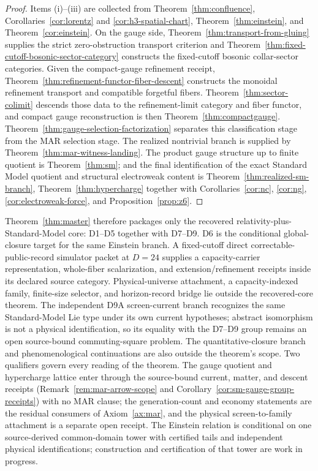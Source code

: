 \documentclass[11pt]{article}
\begin{document}
\begin{proof}
Items (i)--(iii) are collected from Theorem~\ref{thm:confluence}, Corollaries~\ref{cor:lorentz} and \ref{cor:h3-spatial-chart}, Theorem~\ref{thm:einstein}, and Theorem~\ref{cor:einstein}. On the gauge side, Theorem~\ref{thm:transport-from-gluing} supplies the strict zero-obstruction transport criterion and Theorem~\ref{thm:fixed-cutoff-bosonic-sector-category} constructs the fixed-cutoff bosonic collar-sector categories. Given the compact-gauge refinement receipt, Theorem~\ref{thm:refinement-functor-fiber-descent} constructs the monoidal refinement transport and compatible forgetful fibers. Theorem~\ref{thm:sector-colimit} descends those data to the refinement-limit category and fiber functor, and compact gauge reconstruction is then Theorem~\ref{thm:compactgauge}. Theorem~\ref{thm:gauge-selection-factorization} separates this classification stage from the MAR selection stage. The realized nontrivial branch is supplied by Theorem~\ref{thm:mar-witness-landing}. The product gauge structure up to finite quotient is Theorem~\ref{thm:sm}; and the final identification of the exact Standard Model quotient and structural electroweak content is Theorem~\ref{thm:realized-sm-branch}, Theorem~\ref{thm:hypercharge} together with Corollaries~\ref{cor:nc}, \ref{cor:ng}, \ref{cor:electroweak-force}, and Proposition~\ref{prop:z6}.
\end{proof}

Theorem~\ref{thm:master} therefore packages only the recovered relativity-plus-Standard-Model core: D1--D5 together with D7--D9. D6 is the conditional global-closure target for the same Einstein branch. A fixed-cutoff direct correctable-public-record simulator packet at \(D=24\) supplies a capacity-carrier representation, whole-fiber scalarization, and extension/refinement receipts inside its declared source category. Physical-universe attachment, a capacity-indexed family, finite-size selector, and horizon-record bridge lie outside the recovered-core theorem. The independent D9A screen-current branch recognizes the same Standard-Model Lie type under its own current hypotheses; abstract isomorphism is not a physical identification, so its equality with the D7--D9 group remains an open source-bound commuting-square problem. The quantitative-closure branch and phenomenological continuations are also outside the theorem's scope. Two qualifiers govern every reading of the theorem. The gauge quotient and hypercharge lattice enter through the source-bound current, matter, and descent receipts (Remark~\ref{rem:mar-arrow-scope} and Corollary~\ref{cor:sm-gauge-group-receipts}) with no MAR clause; the generation-count and economy statements are the residual consumers of Axiom~\ref{ax:mar}, and the physical screen-to-family attachment is a separate open receipt. The Einstein relation is conditional on one source-derived common-domain tower with certified tails and independent physical identifications; construction and certification of that tower are work in progress.
\end{document}
